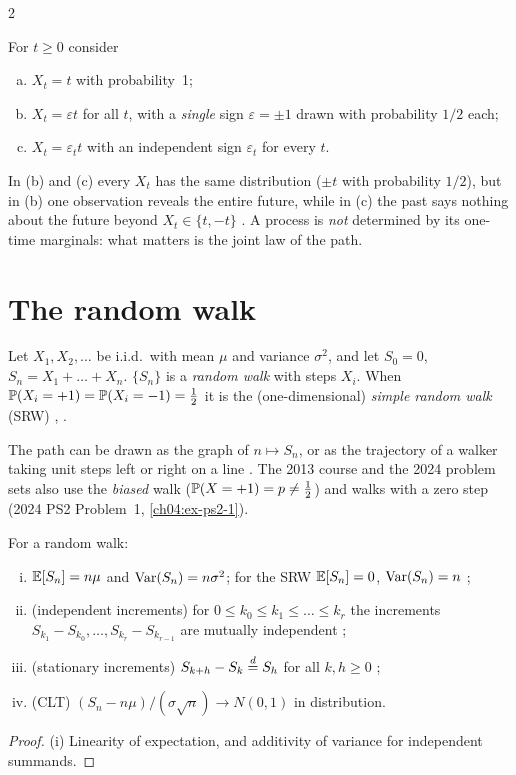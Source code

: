 \begin{paracol}{2}
\begin{example}\label{ch04:ex-threeproc}
For $t\ge0$ consider
\begin{enumerate}[(a)]
  \item $X_t=t$ with probability~1;
  \item $X_t=\varepsilon t$ for all $t$, with a
      \emph{single} sign $\varepsilon=\pm1$ drawn with probability $1/2$ each;
  \item $X_t=\varepsilon_tt$ with an
      independent sign $\varepsilon_t$ for every $t$.
\end{enumerate}
In (b) and (c) every $X_t$ has the same distribution
($\pm t$ with probability $1/2$), but in (b) one observation reveals the entire future, while in (c) the
past says nothing about the future beyond $X_t\in\{t,-t\}$ . A process is \emph{not}
determined by its one-time marginals: what matters is the joint law of the path.
\end{example}

\section{The random walk}\label{ch04:sec-rw}

\begin{definition}\label{ch04:def-rw}
Let $X_1,X_2,\dots$ be i.i.d.\ with mean $\mu$ and variance $\sigma^2$, and let $S_0=0$,
$S_n=X_1+\dots+X_n$. $\{S_n\}$ is a \emph{random walk} with steps $X_i$. When
$\mathbb{P}(X_i=+1)=\mathbb{P}(X_i=-1)=\tfrac12$ it is the (one-dimensional) \emph{simple random walk} (SRW)
, .
\end{definition}

The path can be drawn as the graph of $n\mapsto S_n$, or as the trajectory of a walker taking unit steps
left or right on a line . The 2013 course and the 2024 problem sets also use the
\emph{biased} walk ($\mathbb{P}(X=+1)=p\ne\tfrac12$) and walks with a zero step (2024 PS2 Problem~1,
\cref{ch04:ex-ps2-1}).

\begin{proposition}\label{ch04:prop-rw}
For a random walk:
\begin{enumerate}[(i)]
  \item $\mathbb{E}[S_n]=n\mu$ and $\operatorname{Var}(S_n)=n\sigma^2$; for the SRW $\mathbb{E}[S_n]=0$, $\operatorname{Var}(S_n)=n$ ;
  \item (independent increments) for $0\le k_0\le k_1\le\dots\le k_r$ the increments
        $S_{k_1}-S_{k_0},\dots,S_{k_r}-S_{k_{r-1}}$ are mutually independent ;
  \item (stationary increments) $S_{k+h}-S_k\stackrel{d}{=} S_h$ for all $k,h\ge0$ ;
  \item (CLT) $(S_n-n\mu)/(\sigma\sqrt n)\to N(0,1)$ in distribution.
\end{enumerate}
\end{proposition}
\begin{proof}
(i) Linearity of expectation, and additivity of variance for independent summands.


\end{proof}
\end{paracol}
